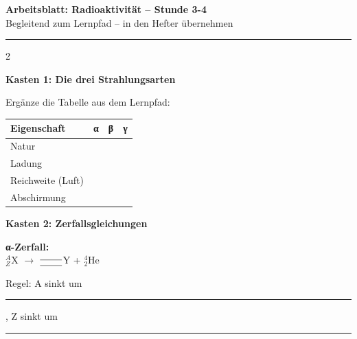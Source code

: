\documentclass[10pt, a4paper]{article}
\newcommand{\fachfarbe}{physik}
\newcommand{\thema}{Radioaktivität}
\newcommand{\stunde}{Stunde 3-4}
\newcommand{\luecke}[1]{\rule{#1}{0.4pt}}
\newcommand{\abschnitt}[1]{%
    \vspace{8pt}\noindent\textbf{\textcolor{\fachfarbe}{#1}}\vspace{4pt}
}
\begin{document}
\begin{center}
{\large\bfseries Arbeitsblatt: \thema{} -- \stunde}\\[2pt]
{\small\textcolor{grau}{Begleitend zum Lernpfad -- in den Hefter übernehmen}}
\end{center}
\vspace{-2pt}\hrule\vspace{8pt}

\begin{multicols}{2}
\small


\abschnitt{Kasten 1: Die drei Strahlungsarten}

\begin{merksatz}[Vergleichstabelle]
Ergänze die Tabelle aus dem Lernpfad:

\vspace{4pt}
\renewcommand{\arraystretch}{1.6}
\begin{tabular}{|p{1.8cm}|p{1.5cm}|p{1.5cm}|p{1.5cm}|}
\hline
\textbf{Eigenschaft} & \textbf{α} & \textbf{β} & \textbf{γ} \\
\hline
Natur & & & \\
\hline
Ladung & & & \\
\hline
Reichweite (Luft) & & & \\
\hline
Abschirmung & & & \\
\hline
\end{tabular}
\renewcommand{\arraystretch}{1}
\end{merksatz}

\vspace{6pt}


\abschnitt{Kasten 2: Zerfallsgleichungen}

\begin{merksatz}
\textbf{α-Zerfall:}\\
$^{A}_{Z}$X $\rightarrow$ $^{\text{\luecke{0.8cm}}}_{\text{\luecke{0.8cm}}}$Y + $^{4}_{2}$He

\vspace{4pt}
Regel: A sinkt um \luecke{1cm}, Z sinkt um \luecke{1cm}

\vspace{8pt}


\end{merksatz}
\end{multicols}
\end{document}
